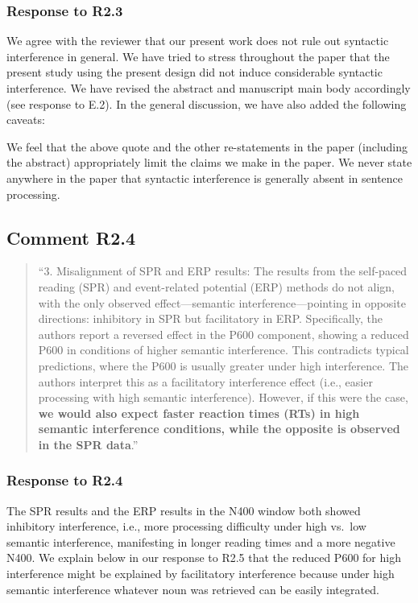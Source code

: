 \documentclass[12pt]{article}
\begin{document}
\subsubsection*{Response to R2.3}
We agree with the reviewer that our present work does not rule out syntactic interference in general. We have tried to stress throughout the paper that the present study using the present design did not induce considerable syntactic interference. We have revised the abstract and manuscript main body accordingly (see response to E.2). In the general discussion, we have also added the following caveats:

\begin{quote}
\end{quote}
 
 We feel that the above quote and the other re-statements in the paper (including the abstract) appropriately limit the claims we make in the paper. We never state anywhere in the paper that syntactic interference is generally absent in sentence processing.
  
\subsection*{Comment R2.4}
\begin{quote}
``3. Misalignment of SPR and ERP results: The results from the self-paced reading (SPR) and event-related potential (ERP) methods do not align, with the only observed effect—semantic interference—pointing in opposite directions: inhibitory in SPR but facilitatory in ERP. Specifically, the authors report a reversed effect in the P600 component, showing a reduced P600 in conditions of higher semantic interference. This contradicts typical predictions, where the P600 is usually greater under high interference. The authors interpret this as a facilitatory interference effect (i.e., easier processing with high semantic interference). However, if this were the case, \textbf{we would also expect faster reaction times (RTs) in high semantic interference conditions, while the opposite is observed in the SPR data}.''
\end{quote}

\subsubsection*{Response to R2.4}
The SPR results and the ERP results in the N400 window both showed inhibitory interference, i.e., more processing difficulty under high vs.\ low semantic interference, manifesting in longer reading times and a more negative N400. We explain below in our response to R2.5 that the reduced P600 for high interference might be explained by facilitatory interference because under high semantic interference whatever noun was retrieved can be easily integrated. 
\end{document}
